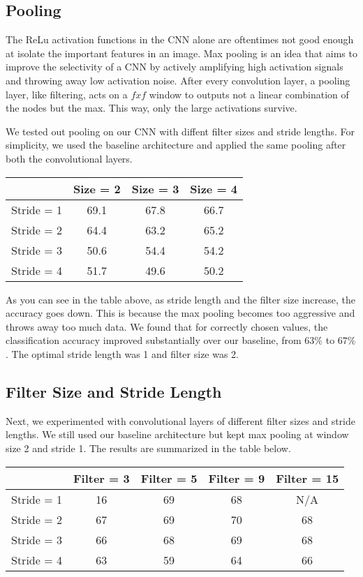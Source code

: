 \documentclass[10pt,twoside]{article}
\begin{document}
\subsection{Pooling}
The ReLu activation functions in the CNN alone are oftentimes not good enough at isolate the important features in an image. Max pooling is an idea that aims to improve the selectivity of a CNN by actively amplifying high activation signals and throwing away low activation noise. After every convolution layer, a pooling layer, like filtering, acts on a $fxf$ window to outputs not a linear combination of the nodes but the max. This way, only the large activations survive. 

We tested out pooling on our CNN with diffent filter sizes and stride lengths. For simplicity, we used the baseline architecture and applied the same pooling after both the convolutional layers.

\begin{center}
 \begin{tabular}{||c c c c||} 
 \hline
  & Size = 2 & Size = 3 & Size = 4 \\ [0.5ex] 
 \hline\hline
 Stride = 1 & 69.1 & 67.8 & 66.7 \\ 
 \hline
 Stride = 2 & 64.4 & 63.2 & 65.2 \\
 \hline
 Stride = 3 & 50.6 & 54.4 & 54.2 \\
 \hline
 Stride = 4 & 51.7 & 49.6 & 50.2 \\
 \hline
\end{tabular}
\end{center}

As you can see in the table above, as stride length and the filter size increase, the accuracy goes down. This is because the max pooling becomes too aggressive and throws away too much data. We found that for correctly chosen values, the classification accuracy improved substantially over our baseline, from $63\%$ to $67\%$. The optimal stride length was 1 and filter size was 2.

\subsection{Filter Size and Stride Length}

 Next, we experimented with convolutional layers of different filter sizes and stride lengths. We still used our baseline architecture but kept max pooling at window size 2 and stride 1. The results are summarized in the table below.

\begin{center}
 \begin{tabular}{||c c c c c||} 
 \hline
  & Filter = 3 & Filter = 5 & Filter = 9 & Filter = 15 \\ [0.5ex] 
 \hline\hline
 Stride = 1 & 16 & 69 & 68 & N/A \\ 
 \hline
 Stride = 2 & 67 & 69 & 70 & 68 \\
 \hline
 Stride = 3 & 66 & 68 & 69 & 68 \\
 \hline
 Stride = 4 & 63 & 59 & 64 & 66 \\
 \hline
\end{tabular}
\end{center}
\end{document}
